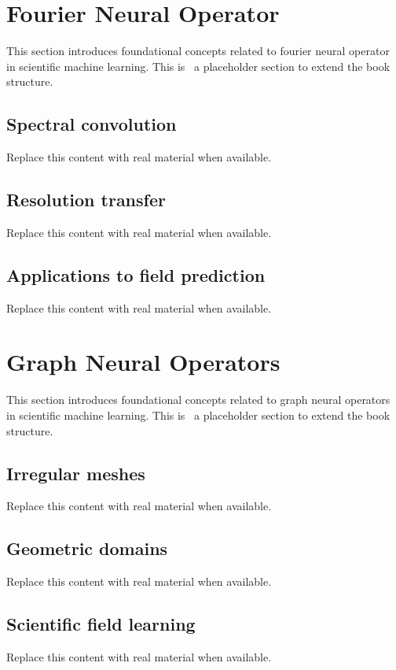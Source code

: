 \section{Fourier Neural Operator}
This section introduces foundational concepts related to fourier neural operator in scientific machine learning. This is~\cite{abdulmaksoudTransformerBasedSensorFusion2025} a placeholder section to extend the book structure.

\subsection{Spectral convolution}
Replace this content with real material when available.

\subsection{Resolution transfer}
Replace this content with real material when available.

\subsection{Applications to field prediction}
Replace this content with real material when available.

\section{Graph Neural Operators}
This section introduces foundational concepts related to graph neural operators in scientific machine learning. This is~\cite{abdulmaksoudTransformerBasedSensorFusion2025} a placeholder section to extend the book structure.

\subsection{Irregular meshes}
Replace this content with real material when available.

\subsection{Geometric domains}
Replace this content with real material when available.

\subsection{Scientific field learning}
Replace this content with real material when available.
